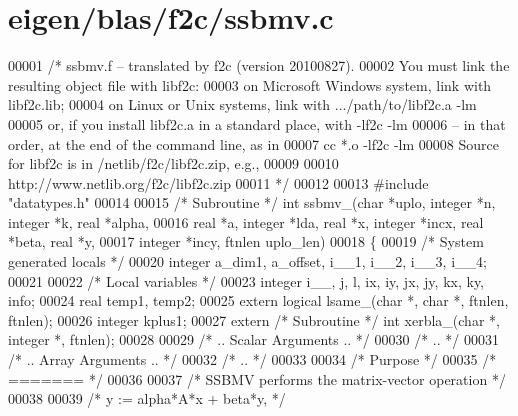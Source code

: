 \hypertarget{eigen_2blas_2f2c_2ssbmv_8c_source}{}\section{eigen/blas/f2c/ssbmv.c}
\label{eigen_2blas_2f2c_2ssbmv_8c_source}

\begin{DoxyCode}
00001 \textcolor{comment}{/* ssbmv.f -- translated by f2c (version 20100827).}
00002 \textcolor{comment}{   You must link the resulting object file with libf2c:}
00003 \textcolor{comment}{    on Microsoft Windows system, link with libf2c.lib;}
00004 \textcolor{comment}{    on Linux or Unix systems, link with .../path/to/libf2c.a -lm}
00005 \textcolor{comment}{    or, if you install libf2c.a in a standard place, with -lf2c -lm}
00006 \textcolor{comment}{    -- in that order, at the end of the command line, as in}
00007 \textcolor{comment}{        cc *.o -lf2c -lm}
00008 \textcolor{comment}{    Source for libf2c is in /netlib/f2c/libf2c.zip, e.g.,}
00009 \textcolor{comment}{}
00010 \textcolor{comment}{        http://www.netlib.org/f2c/libf2c.zip}
00011 \textcolor{comment}{*/}
00012 
00013 \textcolor{preprocessor}{#include "datatypes.h"}
00014 
00015 \textcolor{comment}{/* Subroutine */} \textcolor{keywordtype}{int} ssbmv\_(\textcolor{keywordtype}{char} *uplo, integer *n, integer *k, real *alpha, 
00016     real *a, integer *lda, real *x, integer *incx, real *beta, real *y, 
00017     integer *incy, ftnlen uplo\_len)
00018 \{
00019     \textcolor{comment}{/* System generated locals */}
00020     integer a\_dim1, a\_offset, i\_\_1, i\_\_2, i\_\_3, i\_\_4;
00021 
00022     \textcolor{comment}{/* Local variables */}
00023     integer i\_\_, j, l, ix, iy, jx, jy, kx, ky, info;
00024     real temp1, temp2;
00025     \textcolor{keyword}{extern} logical lsame\_(\textcolor{keywordtype}{char} *, \textcolor{keywordtype}{char} *, ftnlen, ftnlen);
00026     integer kplus1;
00027     \textcolor{keyword}{extern} \textcolor{comment}{/* Subroutine */} \textcolor{keywordtype}{int} xerbla\_(\textcolor{keywordtype}{char} *, integer *, ftnlen);
00028 
00029 \textcolor{comment}{/*     .. Scalar Arguments .. */}
00030 \textcolor{comment}{/*     .. */}
00031 \textcolor{comment}{/*     .. Array Arguments .. */}
00032 \textcolor{comment}{/*     .. */}
00033 
00034 \textcolor{comment}{/*  Purpose */}
00035 \textcolor{comment}{/*  ======= */}
00036 
00037 \textcolor{comment}{/*  SSBMV  performs the matrix-vector  operation */}
00038 
00039 \textcolor{comment}{/*     y := alpha*A*x + beta*y, */}

\end{DoxyCode}
